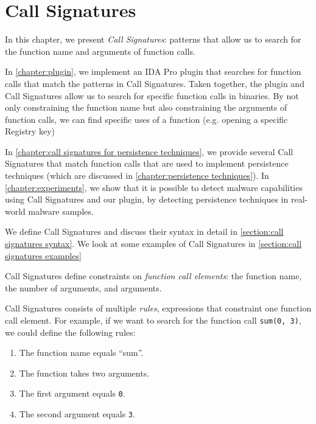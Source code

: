 \chapter{Call Signatures}\label{chapter:call signatures}
In this chapter, we present \emph{Call Signatures}: patterns that allow us to search for the function name and arguments of function calls.

In \autoref{chapter:plugin}, we implement an IDA Pro plugin that searches for function calls that match the patterns in Call Signatures. Taken together, the plugin and Call Signatures allow us to search for specific function calls in binaries. By not only constraining the function name but also constraining the arguments of function calls, we can find specific uses of a function (e.g. opening a specific Registry key)

In \autoref{chapter:call signatures for persistence techniques}, we provide several Call Signatures that match function calls that are used to implement persistence techniques (which are discussed in \autoref{chapter:persistence techniques}). In \autoref{chapter:experiments}, we show that it is possible to detect malware capabilities using Call Signatures and our plugin, by detecting persistence techniques in real-world malware samples.

We define Call Signatures and discuss their syntax in detail in \autoref{section:call signatures syntax}. We look at some examples of Call Signatures in \autoref{section:call signatures examples}

\medskip

Call Signatures define constraints on \emph{function call elements}: the function name, the number of arguments, and arguments.

Call Signatures consists of multiple \emph{rules}, expressions that constraint one function call element. For example, if we want to search for the function call \texttt{sum(0, 3)}, we could define the following rules:
\begin{enumerate}
  \item The function name equals ``sum''.
  \item The function takes two arguments.
  \item The first argument equals \texttt{0}.
  \item The second argument equals \texttt{3}.
\end{enumerate}

\medskip

